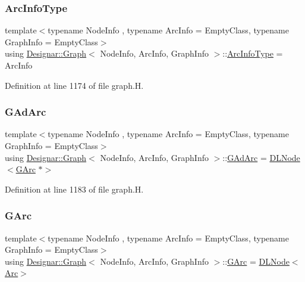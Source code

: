 \subsubsection{\texorpdfstring{Arc\+Info\+Type}{ArcInfoType}}
{\footnotesize\ttfamily template$<$typename Node\+Info , typename Arc\+Info  = Empty\+Class, typename Graph\+Info  = Empty\+Class$>$ \\
using \hyperlink{class_designar_1_1_graph}{Designar\+::\+Graph}$<$ Node\+Info, Arc\+Info, Graph\+Info $>$\+::\hyperlink{class_designar_1_1_graph_abc2adb4841a6d092d5093f9e60f2c8be}{Arc\+Info\+Type} =  Arc\+Info}



Definition at line 1174 of file graph.\+H.

\mbox{\label{class_designar_1_1_graph_a7d00558995946c5653522148b54971bc}} 
\subsubsection{\texorpdfstring{G\+Ad\+Arc}{GAdArc}}
{\footnotesize\ttfamily template$<$typename Node\+Info , typename Arc\+Info  = Empty\+Class, typename Graph\+Info  = Empty\+Class$>$ \\
using \hyperlink{class_designar_1_1_graph}{Designar\+::\+Graph}$<$ Node\+Info, Arc\+Info, Graph\+Info $>$\+::\hyperlink{class_designar_1_1_graph_a7d00558995946c5653522148b54971bc}{G\+Ad\+Arc} =  \hyperlink{class_designar_1_1_d_l_node}{D\+L\+Node}$<$\hyperlink{class_designar_1_1_graph_a5ad9e18b71899c2d4979426e367e5573}{G\+Arc} $\ast$$>$\hspace{0.3cm}{\ttfamily [protected]}}



Definition at line 1183 of file graph.\+H.

\mbox{\label{class_designar_1_1_graph_a5ad9e18b71899c2d4979426e367e5573}} 
\subsubsection{\texorpdfstring{G\+Arc}{GArc}}
{\footnotesize\ttfamily template$<$typename Node\+Info , typename Arc\+Info  = Empty\+Class, typename Graph\+Info  = Empty\+Class$>$ \\
using \hyperlink{class_designar_1_1_graph}{Designar\+::\+Graph}$<$ Node\+Info, Arc\+Info, Graph\+Info $>$\+::\hyperlink{class_designar_1_1_graph_a5ad9e18b71899c2d4979426e367e5573}{G\+Arc} =  \hyperlink{class_designar_1_1_d_l_node}{D\+L\+Node}$<$\hyperlink{class_designar_1_1_graph_a74c730ef4ce2d20f998d72bd25c2b5bf}{Arc}$>$\hspace{0.3cm}{\ttfamily [protected]}}



